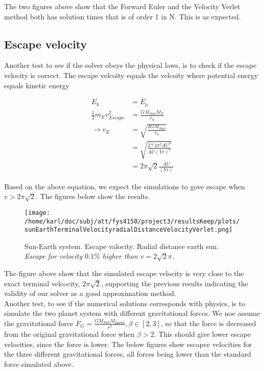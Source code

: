 \documentclass{article}
\begin{document}
The two figures above show that the Forward Euler and the Velocity Verlet method both has solution times that is of order 1 in N. This is as expected. 


\subsection{Escape velocity}
Another test to see if the solver obeys the physical laws, is to check if the escape velocity is correct. The escape velcoity equals the velcoity where potential energy equals kinetic energy

\begin{subequations}
	\begin{align}
	E_k  &= E_p \\
	\frac{1}{2} m_E v_{Escape}^2&= \frac{G M_{Sun} M_E}{r_0}\\
	\rightarrow v_E&=\sqrt{\frac{2G M_{Sun} }{r_0}}\\
	&=\sqrt{\frac{2* 4 \pi^2 AU^3 }{AU (Yr)^2}}\\
	&=2 \pi\sqrt{2}\frac{ AU }{(Yr)}
	\end{align}
\end{subequations}

Based on the above equation, we expect the simulations to gove escape when $v > 2\pi \sqrt{2}$. The figures below show the results.

\begin{figure}[H]
	\centering
	\texttt{[image: /home/karl/doc/subj/att/fys4150/project3/resultsKeep/plots/sunEarthTerminalVelocityradialDistanceVelocityVerlet.png]}
	\caption{Sun-Earth system. Escape valocity. Radial distance earth sun. \\ \textit{Escape for velocity  $0.1 \%$ higher than $v = 2\sqrt{2}\pi$.}}
	\label{1}
\end{figure}



The figure above show that the simulated escape velocity is very close to the exact terminal velcocity, $2 \pi \sqrt{2}$, supporting the previous results indicating the validity of our solver as a good approximation method.\\

Another test, to see if the numerical solutions corresponds with physics, is to simulate the two planet system with different gravitational forces. We noe assume the gravitational force $F_G = \frac{G M_{Sun} M_{Earth}}{r^\beta}, \beta \in [2,3]$, so that the force is decreased from the original gravitational force when $\beta > 2$. This should give lower escape velocities, since the force is lower. The below figures show escapce velocities for the three different gravitational forces, all forces being lower than the standard force simulated above.
\end{document}
